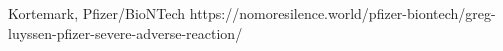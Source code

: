           {Kortemark, }
          {}
          {Pfizer/BioNTech}
          {}
          {
          }
          {https://nomoresilence.world/pfizer-biontech/greg-luyssen-pfizer-severe-adverse-reaction/}


